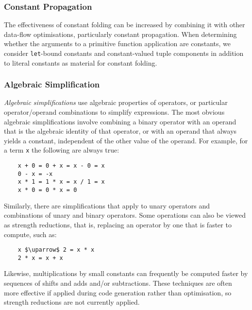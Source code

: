 

\subsubsection{Constant Propagation}

The effectiveness of constant folding can be increased by combining it with
other data-flow optimisations, particularly constant propagation. When
determining whether the arguments to a primitive function application are
constants, we consider \texttt{let}-bound constants and constant-valued tuple
components in addition to literal constants as material for constant folding.


\subsubsection{Algebraic Simplification}

\emph{Algebraic simplifications} use algebraic properties of operators, or
particular operator/operand combinations to simplify expressions. The most
obvious algebraic simplifications involve combining a binary operator with an
operand that is the algebraic identity of that operator, or with an operand that
always yields a constant, independent of the other value of the operand. For
example, for a term \texttt{x} the following are always true:
%
\begin{lstlisting}[style=Haskell,numbers=none]
%\bf$\langle$ algebraic simplification $\rangle$%
    x + 0 = 0 + x = x - 0 = x
    0 - x = -x
    x * 1 = 1 * x = x / 1 = x
    x * 0 = 0 * x = 0
\end{lstlisting}
%
Similarly, there are simplifications that apply to unary operators and
combinations of unary and binary operators. Some operations can also be viewed
as strength reductions, that is, replacing an operator by one that is faster to
compute, such as:
%
\begin{lstlisting}[style=Haskell,numbers=none,mathescape]
%\bf$\langle$ strength reduction $\rangle$%
    x $\uparrow$ 2 = x * x
    2 * x = x + x
\end{lstlisting}
%
Likewise, multiplications by small constants can frequently be computed faster
by sequences of shifts and adds and/or subtractions. These techniques are often
more effective if applied during code generation rather than optimisation, so
strength reductions are not currently applied.


